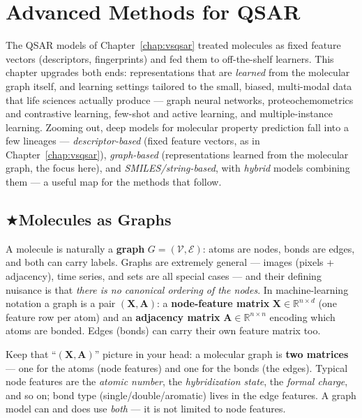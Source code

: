 \documentclass[11pt, oneside]{book}
\makeatletter
\newcommand{\starglyph}{\textcolor{stargold}{\ensuremath{\bigstar}}}
\newcommand{\starsec}[1]{%
  \texorpdfstring{\starglyph\hspace{0.4em}\textcolor{star@frame}{#1}}{#1}}
\newcommand{\R}{\mathbb{R}}
\makeatother
\begin{document}
\chapter{Advanced Methods for QSAR}
\label{chap:advanced}

The QSAR models of Chapter~\ref{chap:vsqsar} treated molecules as fixed feature
vectors (descriptors, fingerprints) and fed them to off-the-shelf learners. This
chapter upgrades both ends: representations that are \emph{learned} from the
molecular graph itself, and learning settings tailored to the small, biased,
multi-modal data that life sciences actually produce --- graph neural networks,
proteochemometrics and contrastive learning, few-shot and active learning, and
multiple-instance learning. Zooming out, deep models for molecular property
prediction fall into a few lineages --- \emph{descriptor-based} (fixed feature
vectors, as in Chapter~\ref{chap:vsqsar}), \emph{graph-based} (representations
learned from the molecular graph, the focus here), and \emph{SMILES/string-based},
with \emph{hybrid} models combining them --- a useful map for the methods that
follow.

\section{\starsec{Molecules as Graphs}}

A molecule is naturally a \textbf{graph} $G=(\mathcal{V},\mathcal{E})$: atoms are
nodes, bonds are edges, and both can carry labels. Graphs are extremely general
--- images (pixels + adjacency), time series, and sets are all special cases ---
and their defining nuisance is that \emph{there is no canonical ordering of the
nodes}. In machine-learning notation a graph is a pair $(\bm{X}, \bm{A})$: a
\textbf{node-feature matrix} $\bm{X}\in\R^{n\times d}$ (one feature row per atom)
and an \textbf{adjacency matrix} $\bm{A}\in\R^{n\times n}$ encoding which atoms are
bonded. Edges (bonds) can carry their own feature matrix too.

\begin{intbox}
Keep that ``$(\bm{X},\bm{A})$'' picture in your head: a molecular graph is
\textbf{two matrices} --- one for the atoms (node features) and one for the bonds
(the edges). Typical node features are the \emph{atomic number}, the
\emph{hybridization state}, the \emph{formal charge}, and so on; bond type
(single/double/aromatic) lives in the edge features. A graph model can and does
use \emph{both} --- it is not limited to node features.
\end{intbox}
\end{document}
